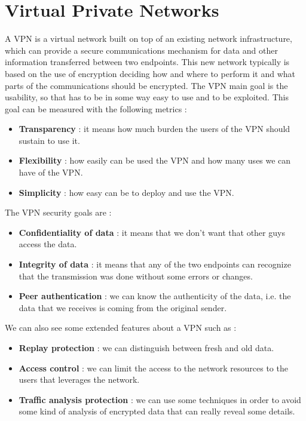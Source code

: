 \documentclass[11pt]{article}
\begin{document}
\section{Virtual Private Networks}
A VPN is a virtual network built on top of an existing network infrastructure, which can provide a secure communications mechanism for data and other information transferred between two endpoints. This new network typically is based on the use of encryption deciding how and where to perform it and what parts of the communications should be encrypted. The VPN main goal is the usability, so that has to be in some way easy to use and to be exploited. This goal can be measured with the following metrics :
\begin{itemize}
\item \textbf{Transparency} : it means how much burden the users of the VPN should sustain to use it.
\item \textbf{Flexibility} : how easily can be used the VPN and how many uses we can have of the VPN.
\item \textbf{Simplicity} : how easy can be to deploy and use the VPN.
\end{itemize}
The VPN security goals are : 
\begin{itemize}
\item \textbf{Confidentiality of data} : it means that we don't want that other guys access the data.
\item \textbf{Integrity of data} : it means that any of the two endpoints can recognize that the transmission was done without some errors or changes.
\item \textbf{Peer authentication} : we can know the authenticity of the data, i.e. the data that we receives is coming from the original sender.
\end{itemize}
We can also see some extended features about a VPN such as :
\begin{itemize}
\item \textbf{Replay protection} : we can distinguish between fresh and old data.
\item \textbf{Access control} : we can limit the access to the network resources to the users that leverages the network.
\item \textbf{Traffic analysis protection} : we can use some techniques in order to avoid some kind of analysis of encrypted data that can really reveal some details.
\end{itemize}
\end{document}
